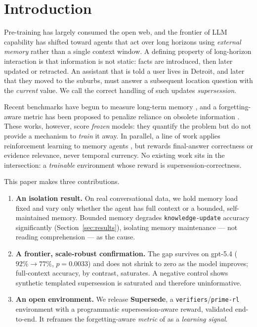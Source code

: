 \documentclass[]{ceurart}
\begin{document}
\maketitle

\section{Introduction}

Pre-training has largely consumed the open web, and the frontier of LLM
capability has shifted toward agents that act over long horizons using
\emph{external memory} rather than a single context window. A defining
property of long-horizon interaction is that information is not static: facts
are introduced, then later updated or retracted. An assistant that is told a
user lives in Detroit, and later that they moved to the suburbs, must answer a
subsequent location question with the \emph{current} value. We call the
correct handling of such updates \emph{supersession}.

Recent benchmarks have begun to measure long-term memory
\cite{maharana2024locomo, wu2025longmemeval, memoryarena2026,
memoryagentbench2025, fama2026}, and a forgetting-aware metric has been
proposed to penalize reliance on obsolete information \cite{fama2026}. These
works, however, score \emph{frozen} models: they quantify the problem but do
not provide a mechanism to \emph{train} it away. In parallel, a line of work
applies reinforcement learning to memory agents \cite{memagent2025,
longrlvr2026}, but rewards final-answer correctness or evidence relevance,
never temporal currency. No existing work sits in the intersection: a
\emph{trainable} environment whose reward is supersession-correctness.

This paper makes three contributions.

\begin{enumerate}
  \item \textbf{An isolation result.} On real conversational data, we hold
  memory load fixed and vary only whether the agent has full context or a
  bounded, self-maintained memory. Bounded memory degrades
  \texttt{knowledge-update} accuracy significantly (Section~\ref{sec:results}),
  isolating memory maintenance --- not reading comprehension --- as the cause.
  \item \textbf{A frontier, scale-robust confirmation.} The gap survives on
  gpt-5.4 ($92\%\!\rightarrow\!77\%$, $p=0.0033$) and does not shrink to zero
  as the model improves; full-context accuracy, by contrast, saturates. A
  negative control shows synthetic templated supersession is saturated and
  therefore uninformative.
  \item \textbf{An open environment.} We release \textbf{Supersede}, a
  \texttt{verifiers}/\texttt{prime-rl} environment with a programmatic
  supersession-aware reward, validated end-to-end. It reframes the
  forgetting-aware \emph{metric} of \cite{fama2026} as a \emph{learning
  signal}.
\end{enumerate}
\end{document}

